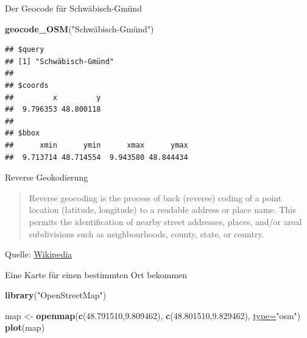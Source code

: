 \documentclass[ignorenonframetext,]{beamer}
\newenvironment{Shaded}{\begin{snugshade}}{\end{snugshade}}
\newcommand{\KeywordTok}[1]{\textcolor[rgb]{0.26,0.66,0.93}{\textbf{#1}}}
\newcommand{\DataTypeTok}[1]{\textcolor[rgb]{0.74,0.68,0.62}{\underline{#1}}}
\newcommand{\FloatTok}[1]{\textcolor[rgb]{0.27,0.67,0.26}{#1}}
\newcommand{\StringTok}[1]{\textcolor[rgb]{0.02,0.61,0.04}{#1}}
\newcommand{\NormalTok}[1]{\textcolor[rgb]{0.74,0.68,0.62}{#1}}
\begin{document}
\begin{frame}[fragile]{Der Geocode für Schwäbisch-Gmünd}

\begin{Shaded}
\begin{Highlighting}[]
\KeywordTok{geocode_OSM}\NormalTok{(}\StringTok{"Schwäbisch-Gmünd")}
\end{Highlighting}
\end{Shaded}

\begin{verbatim}
## $query
## [1] "Schwäbisch-Gmünd"
## 
## $coords
##         x         y 
##  9.796353 48.800118 
## 
## $bbox
##      xmin      ymin      xmax      ymax 
##  9.713714 48.714554  9.943580 48.844434
\end{verbatim}

\end{frame}

\begin{frame}{Reverse Geokodierung}

\begin{quote}
Reverse geocoding is the process of back (reverse) coding of a point
location (latitude, longitude) to a readable address or place name. This
permits the identification of nearby street addresses, places, and/or
areal subdivisions such as neighbourhoods, county, state, or country.
\end{quote}

Quelle:
\href{https://en.wikipedia.org/wiki/Reverse_geocoding}{Wikipedia}

\end{frame}

\begin{frame}[fragile]{Eine Karte für einen bestimmten Ort bekommen}

\begin{Shaded}
\begin{Highlighting}[]
\KeywordTok{library}\NormalTok{(}\StringTok{"OpenStreetMap"}\NormalTok{)}

\NormalTok{map <-}\StringTok{ }\KeywordTok{openmap}\NormalTok{(}\KeywordTok{c}\NormalTok{(}\FloatTok{48.791510}\NormalTok{,}\FloatTok{9.809462}\NormalTok{),}
               \KeywordTok{c}\NormalTok{(}\FloatTok{48.801510}\NormalTok{,}\FloatTok{9.829462}\NormalTok{),}
               \DataTypeTok{type=}\StringTok{"osm"}\NormalTok{)}
\KeywordTok{plot}\NormalTok{(map)}
\end{Highlighting}
\end{Shaded}

\end{frame}
\end{document}
